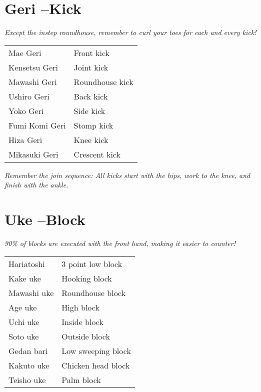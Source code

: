 \documentclass[11pt]{article}
\begin{document}
\section{Geri --Kick}
\label{sec:org334c71a}
\begin{center}
\emph{Except the instep roundhouse, remember to curl your toes for each and every kick!}
\end{center}
\begin{center}
\begin{tabular}{ll}
Mae Geri & Front kick\\
Kensetsu Geri & Joint kick\\
Mawashi Geri & Roundhouse kick\\
Ushiro Geri & Back kick\\
Yoko Geri & Side kick\\
Fumi Komi Geri & Stomp kick\\
Hiza Geri & Knee kick\\
Mikasuki Geri & Crescent kick\\
\end{tabular}
\end{center}

\begin{center}
\emph{Remember the join sequence: All kicks start with the hips, work to the knee, and finish with the ankle.}
\end{center}
\section{Uke --Block}
\label{sec:org38c5cfd}
\begin{center}
\emph{90\% of blocks are executed with the front hand, making it easier to counter!}
\end{center}

\begin{center}
\begin{tabular}{ll}
Hariatoshi & 3 point low block\\
Kake uke & Hooking block\\
Mawashi uke & Roundhouse block\\
Age uke & High block\\
Uchi uke & Inside block\\
Soto uke & Outside block\\
Gedan bari & Low sweeping block\\
Kakuto uke & Chicken head block\\
Teisho uke & Palm block\\
\end{tabular}
\end{center}
\end{document}
